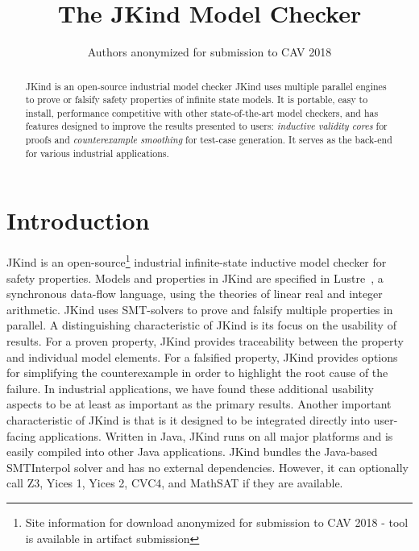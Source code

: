 \documentclass{llncs}
\title{The JKind Model Checker}
\author{ Authors anonymized for submission to CAV 2018
  }
\institute{ Institute anonymized for submission to CAV 2018
}
\newcommand{\jkind}{{\sc JKind}\xspace}
\newcommand{\lustre}{{\sc Lustre}\xspace}
\newcommand{\yices}{{\sc Yices}\xspace}
\newcommand{\zthree}{{\sc Z3}\xspace}
\begin{document}
\maketitle

\begin{abstract}
  \jkind is an open-source industrial model checker 
  \jkind uses
  multiple parallel engines to prove or falsify safety properties of
  infinite state models. It is portable, easy to install, performance competitive with other state-of-the-art model checkers, and has features designed to improve the results presented to users: {\em inductive validity cores} for proofs and {\em counterexample smoothing} for test-case generation.  It serves as the back-end for
  various industrial applications.
\end{abstract}

\section{Introduction}

\jkind is an
open-source\footnote{Site information for download anonymized for submission to CAV 2018 - tool is available in artifact submission %
} industrial
infinite-state inductive model checker for safety properties. Models
and properties in \jkind are specified in
\lustre~\cite{halbwachs1991ieee}, a synchronous data-flow language,
using the theories of linear real and integer arithmetic. \jkind uses
SMT-solvers to prove and falsify multiple properties in parallel.
%
A distinguishing characteristic of \jkind is its focus on the usability  of results. For a proven property, \jkind provides traceability between the property and individual model elements. For a falsified property, \jkind provides options for simplifying the
counterexample in order to highlight the root cause of the failure. In industrial applications, we have found these additional usability aspects to be at least as important as the primary results.
%
Another important characteristic of \jkind is that is it designed to be integrated directly into user-facing applications. Written in Java, \jkind runs on all major platforms and is easily compiled into other Java applications. \jkind bundles the Java-based {\sc SMTInterpol} solver and has no external dependencies. However, it can optionally call \zthree, \yices 1, \yices 2, {\sc CVC4}, and {\sc
  MathSAT} if they are available.
\end{document}
